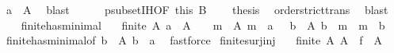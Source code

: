 \begin{isabellebody}
\ {\isacartoucheopen}a\ {\isasymin}\ A{\isacartoucheclose}\ \isamarkupfalse%
\ blast\isanewline
\ \ \ \ \isamarkupfalse%
\ psubset{\isachardot}{\kern0pt}IH{\isacharbrackleft}{\kern0pt}OF\ this\ {\isacartoucheopen}{\isacharquery}{\kern0pt}B\ {\isasymnoteq}\ {\isacharbraceleft}{\kern0pt}{\isacharbraceright}{\kern0pt}{\isacartoucheclose}{\isacharbrackright}{\kern0pt}\ \isamarkupfalse%
\ {\isacharquery}{\kern0pt}thesis\ \isamarkupfalse%
\ order{\isachardot}{\kern0pt}strict{\isacharunderscore}{\kern0pt}trans{}\ \isamarkupfalse%
\ blast\isanewline
\ \ \isamarkupfalse%
\isanewline
{}\isamarkupfalse%
%
\endisatagproof
{\isafoldproof}%
%
\isadelimproof
\isanewline
%
\endisadelimproof
\isanewline
{}\isamarkupfalse%
\ finite{\isacharunderscore}{\kern0pt}has{\isacharunderscore}{\kern0pt}minimal{}{\isacharcolon}{\kern0pt}\isanewline
\ \ {\isachardoublequoteopen}{\isasymlbrakk}\ finite\ A{\isacharsemicolon}{\kern0pt}\ a\ {\isasymin}\ A\ {\isasymrbrakk}\ {\isasymLongrightarrow}\ {\isasymexists}\ m\ {\isasymin}\ A{\isachardot}{\kern0pt}\ m\ {\isasymle}\ a\ {\isasymand}\ {\isacharparenleft}{\kern0pt}{\isasymforall}\ b\ {\isasymin}\ A{\isachardot}{\kern0pt}\ b\ {\isasymle}\ m\ {\isasymlongrightarrow}\ m\ {\isacharequal}{\kern0pt}\ b{\isacharparenright}{\kern0pt}{\isachardoublequoteclose}\isanewline
%
\isadelimproof
%
\endisadelimproof
%
\isatagproof
{}\isamarkupfalse%
\ finite{\isacharunderscore}{\kern0pt}has{\isacharunderscore}{\kern0pt}minimal{\isacharbrackleft}{\kern0pt}of\ {\isachardoublequoteopen}{\isacharbraceleft}{\kern0pt}b\ {\isasymin}\ A{\isachardot}{\kern0pt}\ b\ {\isasymle}\ a{\isacharbraceright}{\kern0pt}{\isachardoublequoteclose}{\isacharbrackright}{\kern0pt}\ \isamarkupfalse%
\ fastforce%
\endisatagproof
{\isafoldproof}%
%
\isadelimproof
\isanewline
%
\endisadelimproof
\isanewline
{}\isamarkupfalse%
%
\isadelimdocument
%
\endisadelimdocument
%
\isatagdocument
%
\isamarkuptrue%
%
\endisatagdocument
{\isafolddocument}%
%
\isadelimdocument
%
\endisadelimdocument
{}\isamarkupfalse%
\ finite{\isacharunderscore}{\kern0pt}surj{\isacharunderscore}{\kern0pt}inj{\isacharcolon}{\kern0pt}\isanewline
\ \ \ {\isachardoublequoteopen}finite\ A{\isachardoublequoteclose}\ {\isachardoublequoteopen}A\ {\isasymsubseteq}\ f\ {\isacharbackquote}{\kern0pt}\ A{\isachardoublequoteclose}\isanewline

\end{isabellebody}

